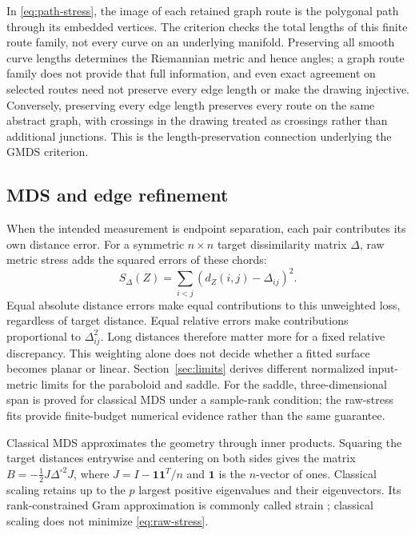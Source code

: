 \documentclass[11pt]{article}
\newcommand{\one}{\mathbf 1}
\begin{document}
In \eqref{eq:path-stress}, the image of each retained graph route is the
polygonal path through its embedded vertices. The criterion checks the total
lengths of this finite route family, not every curve on an underlying
manifold. Preserving all smooth curve lengths determines the Riemannian
metric and hence angles; a graph route family does not provide that full
information, and even exact agreement on selected routes need not preserve
every edge length or make the drawing injective. Conversely, preserving every
edge length preserves every route on the same abstract graph, with crossings
in the drawing treated as crossings rather than additional junctions. This is
the length-preservation connection underlying the GMDS criterion.

\subsection{MDS and edge refinement}
When the intended measurement is endpoint separation, each pair contributes
its own distance error. For a symmetric $n\times n$ target dissimilarity
matrix $\Delta$, raw metric stress adds the squared errors of these chords:
\begin{equation}
 S_\Delta(Z)=\sum_{i<j}(d_Z(i,j)-\Delta_{ij})^2.
 \label{eq:raw-stress}
\end{equation}
Equal absolute distance errors make equal contributions to this unweighted
loss, regardless of target distance. Equal relative errors make contributions
proportional to $\Delta_{ij}^2$. Long distances therefore matter more for a
fixed relative discrepancy. This weighting alone does not decide whether a
fitted surface becomes planar or linear. Section~\ref{sec:limits} derives
different normalized input-metric limits for the paraboloid and saddle.
For the saddle, three-dimensional span is proved for classical MDS under a
sample-rank condition; the raw-stress fits provide finite-budget numerical
evidence rather than the same guarantee.

Classical MDS approximates the geometry through inner products. Squaring the
target distances entrywise and centering on both sides gives the matrix
$B=-\tfrac12J\Delta^{\circ2}J$, where $J=I-\one\one^T/n$ and $\one$ is the
$n$-vector of ones. Classical scaling retains up to the $p$ largest positive
eigenvalues and their eigenvectors. Its rank-constrained Gram approximation
is commonly called strain \citep[Theorem~2]{lim2024}; classical scaling does
not minimize \eqref{eq:raw-stress}.
\end{document}
